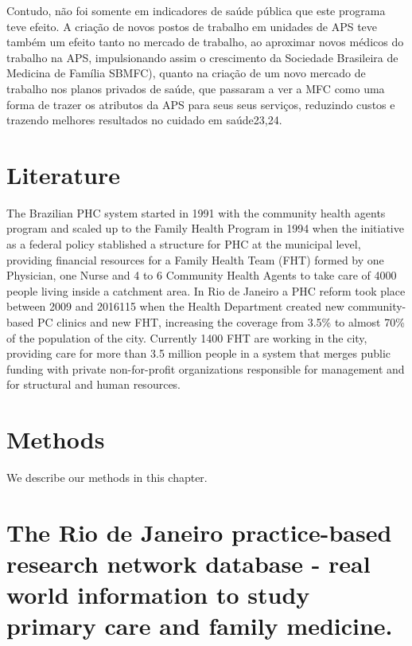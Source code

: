 \documentclass[]{book}
\begin{document}
Contudo, não foi somente em indicadores de saúde pública que este programa teve efeito. A criação de novos postos de trabalho em unidades de APS teve também um efeito tanto no mercado de trabalho, ao aproximar novos médicos do trabalho na APS, impulsionando assim o crescimento da Sociedade Brasileira de Medicina de Família SBMFC), quanto na criação de um novo mercado de trabalho nos planos privados de saúde, que passaram a ver a MFC como uma forma de trazer os atributos da APS para seus seus serviços, reduzindo custos e trazendo melhores resultados no cuidado em saúde23,24.

\hypertarget{literature}{%
\chapter*{Literature}\label{literature}}

The Brazilian PHC system started in 1991 with the community health agents program and scaled up to the Family Health Program in 1994 when the initiative as a federal policy stablished a structure for PHC at the municipal level, providing financial resources for a Family Health Team (FHT) formed by one Physician, one Nurse and 4 to 6 Community Health Agents to take care of 4000 people living inside a catchment area. In Rio de Janeiro a PHC reform took place between 2009 and 2016115 when the Health Department created new community-based PC clinics and new FHT, increasing the coverage from 3.5\% to almost 70\% of the population of the city. Currently 1400 FHT are working in the city, providing care for more than 3.5 million people in a system that merges public funding with private non-for-profit organizations responsible for management and for structural and human resources.

\hypertarget{methods}{%
\chapter*{Methods}\label{methods}}

We describe our methods in this chapter.

\hypertarget{the-rio-de-janeiro-practice-based-research-network-database---real-world-information-to-study-primary-care-and-family-medicine.}{%
\chapter*{The Rio de Janeiro practice-based research network database - real world information to study primary care and family medicine.}\label{the-rio-de-janeiro-practice-based-research-network-database---real-world-information-to-study-primary-care-and-family-medicine.}}
\end{document}
